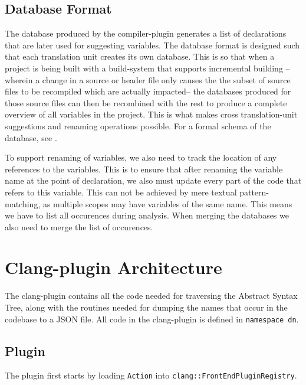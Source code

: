 \subsection{Database Format}
\label{sec:dbfmt}
The database produced by the compiler-plugin generates a list of declarations
that are later used for suggesting variables.
The database format is designed such that each translation unit creates its own
database. This is so that when a project is being built with a build-system that
supports incremental building --wherein a change in a source or header file only
causes the the subset of source files to be recompiled which are actually
impacted-- the databases produced for those source files can then be recombined
with the rest to produce a complete overview of all variables in the project.
This is what makes cross translation-unit suggestions and renaming operations
possible. For a formal schema of the database, see .

To support renaming of variables, we also need to track the location of any
references to the variables. This is to ensure that after renaming the
variable name at the point of declaration, we also must update every part of the
code that refers to this variable. This can not be achieved by mere textual
pattern-matching, as multiple scopes may have variables of the same name. This
means we have to list all occurences during analysis. When merging the databases
we also need to merge the list of occurences.

\section{Clang-plugin Architecture}

The clang-plugin contains all the code needed for traversing the Abstract
Syntax Tree, along with the routines needed for dumping the names that occur in
the codebase to a JSON file. All code in the clang-plugin is defined in
\lstinline|namespace dn|.

\subsection{Plugin}
The plugin first starts by loading \lstinline|Action| into
\lstinline|clang::FrontEndPluginRegistry|.

